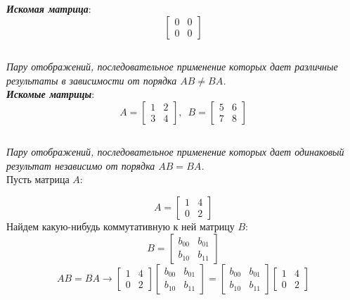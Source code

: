\documentclass[a5paper, 10pt]{article}
\theoremstyle{definition}
\theoremstyle{plain}
\theoremstyle{remark}
\begin{document}
\textit{\textbf{Искомая матрица}}:
\begin{equation}
\begin{bmatrix}
0 & 0\\
0 & 0
\end{bmatrix}
\end{equation}


\subsection{}
\textit{Пару отображений, последовательное применение которых дает различные результаты в зависимости от порядка $AB \neq BA$.}\\

\textit{\textbf{Искомые матрицы}}:
\begin{equation}
A=
\begin{bmatrix}
1 & 2\\
3 & 4
\end{bmatrix}
, \, \, \, 
B=
\begin{bmatrix}
5 & 6\\
7 & 8
\end{bmatrix}
\end{equation}

\newpage
\subsection{}
\textit{Пару отображений, последовательное применение которых дает одинаковый результат независимо от порядка $AB = BA$.}\\
Пусть матрица $A$:

\begin{equation}
A=
\begin{bmatrix}
1 & 4\\
0 & 2
\end{bmatrix}
\end{equation}
Найдем какую-нибудь коммутативную к ней матрицу $B$:
\begin{equation}
B=
\begin{bmatrix}
b_{0 0} & b_{0 1}\\
b_{1 0} & b_{1 1}
\end{bmatrix}
\end{equation}
\begin{equation}
AB= BA \to
\begin{bmatrix}
1 & 4\\
0 & 2
\end{bmatrix}
\begin{bmatrix}
b_{0 0} & b_{0 1}\\
b_{1 0} & b_{1 1}
\end{bmatrix}
=
\begin{bmatrix}
b_{0 0} & b_{0 1}\\
b_{1 0} & b_{1 1}
\end{bmatrix}
\begin{bmatrix}
1 & 4\\
0 & 2
\end{bmatrix}
\end{equation}
\end{document}
